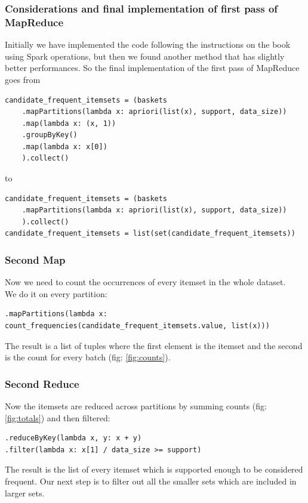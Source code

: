 \documentclass[a4paper]{article}
\begin{document}
	\subsubsection{Considerations and final implementation of first pass of MapReduce}
	Initially we have implemented the code following the instructions on the book using Spark operations, but then we found another method that has slightly better performances. So the final implementation of the first pass of MapReduce goes from
	\begin{lstlisting}
candidate_frequent_itemsets = (baskets
    .mapPartitions(lambda x: apriori(list(x), support, data_size))
    .map(lambda x: (x, 1))                                             
    .groupByKey()                                                      
    .map(lambda x: x[0])                                               
    ).collect()
\end{lstlisting}
to
	\begin{lstlisting}
candidate_frequent_itemsets = (baskets
    .mapPartitions(lambda x: apriori(list(x), support, data_size))
    ).collect()
candidate_frequent_itemsets = list(set(candidate_frequent_itemsets))
\end{lstlisting}
	
	\subsubsection{Second Map}
	Now we need to count the occurrences of every itemset in the whole dataset.\\
	We do it on every partition:
	\begin{lstlisting}[numbers=none]
.mapPartitions(lambda x: count_frequencies(candidate_frequent_itemsets.value, list(x)))
\end{lstlisting}
	The result is a list of tuples where the first element is the itemset and the second is the count for every batch (fig: \ref{fig:counts}).
	
	\subsubsection{Second Reduce}
	Now the itemsets are reduced across partitions by summing counts (fig: \ref{fig:totals}) and then filtered:
	\begin{lstlisting}
.reduceByKey(lambda x, y: x + y)
.filter(lambda x: x[1] / data_size >= support)
\end{lstlisting}	
	The result is the list of every itemset which is supported enough to be considered frequent. Our next step is to filter out all the smaller sets which are included in larger sets.
	
\end{document}
